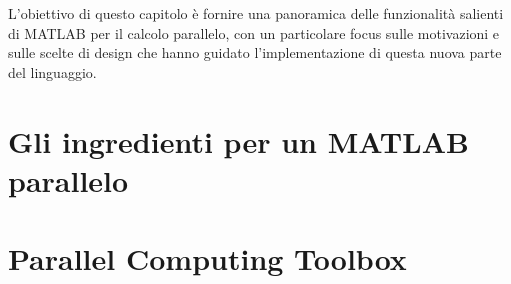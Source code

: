 \documentclass[
	a4paper,
	twoside,
	12pt
]{book}
\theoremstyle{StileEsempio}
\begin{document}
L'obiettivo di questo capitolo \`e fornire una panoramica delle funzionalit\`a salienti di MATLAB per il calcolo parallelo,
con un particolare focus sulle motivazioni e sulle scelte di design che hanno guidato l'implementazione di questa nuova parte del linguaggio.
\section{Gli ingredienti per un MATLAB parallelo}
\label{par2.1}

\section{Parallel Computing Toolbox}
\label{par2.2}

\backmatter

%
\printbibliography
{}
%
\end{document}
